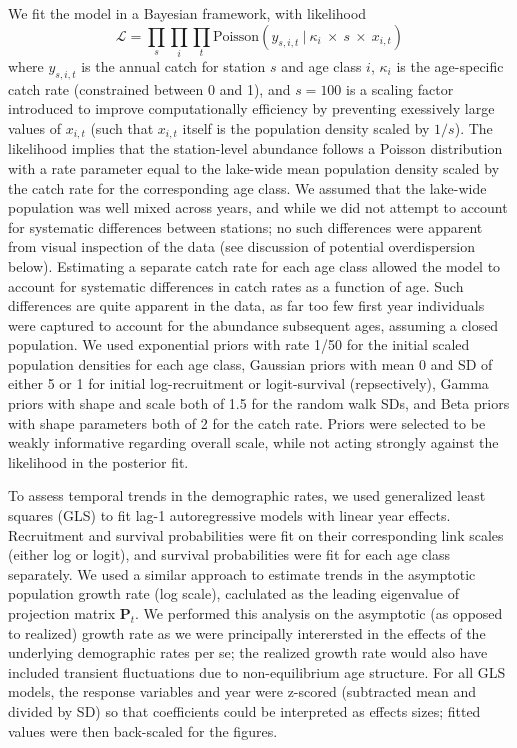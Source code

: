 We fit the model in a Bayesian framework, with likelihood
%
\begin{equation} \label{eq:likelihood}
\mathcal{L} = 
\displaystyle\prod_{s}
\displaystyle\prod_{i}
\displaystyle\prod_{t}
\text{Poisson}
    \left(
        y_{s,i,t}~|~\kappa_i~\times~s~\times~x_{i,t}
    \right)
\end{equation}
%
where $y_{s,i,t}$ is the annual catch for station $s$ and age class $i$,
$\kappa_i$ is the age-specific catch rate (constrained between 0 and 1),
and $s=100$ is a scaling factor introduced to improve computationally efficiency
by preventing exessively large values of $x_{i,t}$ 
(such that $x_{i,t}$ itself is the population density scaled by $1/s$).
The likelihood implies that the station-level abundance follows a Poisson distribution
with a rate parameter equal to the lake-wide mean population density 
scaled by the catch rate for the corresponding age class.
We assumed that the lake-wide population was well mixed across years,
and while we did not attempt to account for systematic differences between stations;
no such differences were apparent from visual inspection of the data 
(see discussion of potential overdispersion below).
Estimating a separate catch rate for each age class allowed the model to account
for systematic differences in catch rates as a function of age.
Such differences are quite apparent in the data, 
as far too few first year individuals were captured to account for the abundance subsequent
ages, assuming a closed population. 
We used exponential priors with rate 1/50 for the initial scaled population densities for
each age class, 
Gaussian priors with mean 0 and SD of either 5 or 1 for 
initial log-recruitment or logit-survival (repsectively), 
Gamma priors with shape and scale both of 1.5 for the random walk SDs,
and Beta priors with shape parameters both of 2 for the catch rate.
Priors were selected to be weakly informative regarding overall scale, 
while not acting strongly against the likelihood in the posterior fit.

To assess temporal trends in the demographic rates, 
we used generalized least squares  (GLS) to fit lag-1 autoregressive models
with linear year effects.
Recruitment and survival probabilities were fit on their corresponding link scales 
(either log or logit),
and survival probabilities were fit for each age class separately.
We used a similar approach to estimate trends in the asymptotic population growth rate
(log scale), 
caclulated as the leading eigenvalue of projection matrix $\mathbf{P}_{t}$.
We performed this analysis on the asymptotic (as opposed to realized) growth rate 
as we were principally interersted in the effects 
of the underlying demographic rates per se; 
the realized growth rate would also have included transient fluctuations due to
non-equilibrium age structure.
For all GLS models, the response variables and year were z-scored 
(subtracted mean and divided by SD) so that coefficients
could be interpreted as effects sizes;
fitted values were then back-scaled for the figures.

